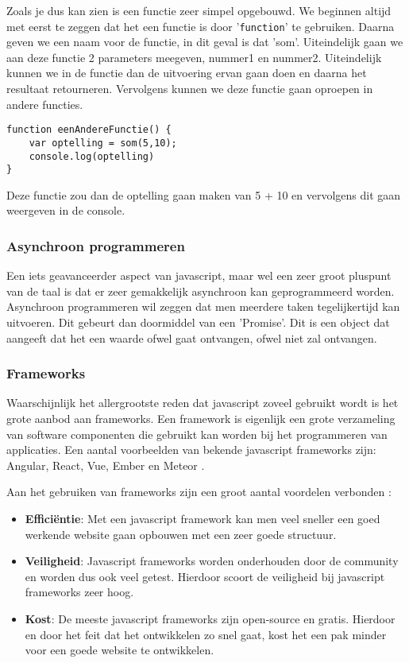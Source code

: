 Zoals je dus kan zien is een functie zeer simpel opgebouwd. We beginnen altijd met eerst te zeggen dat het een functie is door '\lstinline[basicstyle=\ttfamily\color{red}]|function|' te gebruiken. Daarna geven we een naam voor de functie, in dit geval is dat 'som'. Uiteindelijk gaan we aan deze functie 2 parameters meegeven, nummer1 en nummer2. Uiteindelijk kunnen we in de functie dan de uitvoering ervan gaan doen en daarna het resultaat retourneren. Vervolgens kunnen we deze functie gaan oproepen in andere functies.

\begin{lstlisting}[frame=single]
function eenAndereFunctie() {
	var optelling = som(5,10);
	console.log(optelling)
}
\end{lstlisting}

Deze functie zou dan de optelling gaan maken van 5 + 10 en vervolgens dit gaan weergeven in de console.

\subsubsection{Asynchroon programmeren}
\label{sssec:asynchroon-programmeren}
Een iets geavanceerder aspect van javascript, maar wel een zeer groot pluspunt van de taal is dat er zeer gemakkelijk asynchroon kan geprogrammeerd worden. Asynchroon programmeren wil zeggen dat men meerdere taken tegelijkertijd kan uitvoeren. Dit gebeurt dan doormiddel van een 'Promise'. Dit is een object dat aangeeft dat het een waarde ofwel gaat ontvangen, ofwel niet zal ontvangen.

\subsubsection{Frameworks}
\label{sssec:frameworks}
Waarschijnlijk het allergrootste reden dat javascript zoveel gebruikt wordt is het grote aanbod aan frameworks. Een framework is eigenlijk een grote verzameling van software componenten die gebruikt kan worden bij het programmeren van applicaties. Een aantal voorbeelden van bekende javascript frameworks zijn: Angular, React, Vue, Ember en Meteor \autocite{Korotya2018}.

Aan het gebruiken van frameworks zijn een groot aantal voordelen verbonden \autocite{Korotya2018}:

\begin{itemize}
	\item \textbf{Efficiëntie}: Met een javascript framework kan men veel sneller een goed werkende website gaan opbouwen met een zeer goede structuur.
	\item \textbf{Veiligheid}: Javascript frameworks worden onderhouden door de community en worden dus ook veel getest. Hierdoor scoort de veiligheid bij javascript frameworks zeer hoog.
	\item \textbf{Kost}: De meeste javascript frameworks zijn open-source en gratis. Hierdoor en door het feit dat het ontwikkelen zo snel gaat, kost het een pak minder voor een goede website te ontwikkelen.
\end{itemize}

